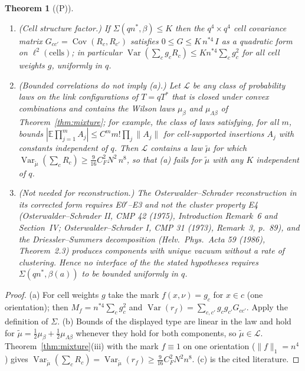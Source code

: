 \documentclass[11pt]{article}
\newtheorem{theorem}{Theorem}[section]
\theoremstyle{definition}
\newcommand{\E}{\mathbb{E}}
\newcommand{\Var}{\operatorname{Var}}
\newcommand{\Cov}{\operatorname{Cov}}
\begin{document}
\begin{theorem}[(P)]\label{thm:IR}
\begin{enumerate}
\item[(a)] (Cell structure factor.) If $\Sigma(qn^*,\beta)\le K$ then the $q^4\times q^4$ cell covariance matrix
$G_{cc'}=\Cov(R_c,R_{c'})$ satisfies $0\le G\le K\,n^{*4}\,I$ as a quadratic form on $\ell^2(\text{cells})$; in particular
$\Var(\sum_cg_cR_c)\le Kn^{*4}\sum_cg_c^2$ for all cell weights $g$, uniformly in $q$.
\item[(b)] (Bounded correlations do not imply (a).) Let $\mathcal L$ be any class of probability laws on the link
configurations of $T=qT^*$ that is closed under convex combinations and contains the Wilson laws $\mu_\beta$ and
$\mu_{\Lambda\beta}$ of Theorem~\ref{thm:mixture}; for example, the class of laws satisfying, for all $m$, bounds
$|\E\prod_{j=1}^mA_j|\le C^mm!\prod_j\|A_j\|$ for cell-supported insertions $A_j$ with constants independent of $q$.
Then $\mathcal L$ contains a law $\tilde\mu$ for which $\Var_{\tilde\mu}(\sum_cR_c)\ge\tfrac9{16}C_F^2N^2\,n^8$, so that
(a) fails for $\tilde\mu$ with any $K$ independent of $q$.
\item[(c)] (Not needed for reconstruction.) The Osterwalder--Schrader reconstruction in its corrected form requires
E0$'$--E3 and not the cluster property E4 (Osterwalder--Schrader II, CMP 42 (1975), Introduction Remark~6 and Section~IV;
Osterwalder--Schrader I, CMP 31 (1973), Remark~3, p.~89), and the Driessler--Summers decomposition (Helv.\ Phys.\ Acta 59
(1986), Theorem~2.3) produces components with unique vacuum without a rate of clustering. Hence no interface of the
the stated hypotheses requires $\Sigma(qn^*,\beta(a))$ to be bounded uniformly in $q$.
\end{enumerate}
\end{theorem}
\begin{proof}
(a) For cell weights $g$ take the mark $f(x,\nu)=g_c$ for $x\in c$ (one orientation); then $M_f=n^{*4}\sum_cg_c^2$ and
$\Var(r_f)=\sum_{c,c'}g_cg_{c'}G_{cc'}$. Apply the definition of $\Sigma$.
(b) Bounds of the displayed type are linear in the law and hold for $\tilde\mu=\frac12\mu_\beta+\frac12\mu_{\Lambda\beta}$
whenever they hold for both components, so $\tilde\mu\in\mathcal L$. Theorem~\ref{thm:mixture}(iii) with the mark
$f\equiv1$ on one orientation ($\|f\|_1=n^4$) gives $\Var_{\tilde\mu}(\sum_cR_c)=\Var_{\tilde\mu}(r_f)\ge\tfrac9{16}C_F^2N^2n^8$.
(c) is the cited literature.
\end{proof}
\end{document}
